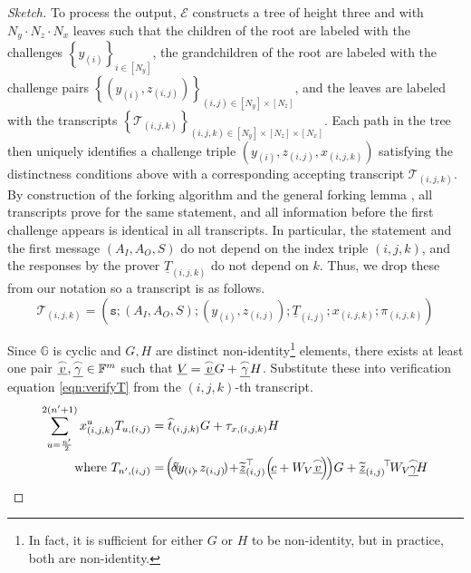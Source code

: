 \documentclass{article}
\theoremstyle{definition}
\newcommand{\GG}{\mathbb{G}}
\newcommand{\zq}{\widetilde{\underline{z}}}
\begin{document}
\begin{proof}[Sketch]
To process the output, $\mathcal{E}$ constructs a tree of height three and with $N_y \cdot N_z \cdot N_x$ leaves such that the children of the root are labeled with the challenges $\left\{y_{(i)}\right\}_{i \in [N_y]}$, the grandchildren of the root are labeled with the challenge pairs $\left\{(y_{(i)}, z_{(i,j)})\right\}_{(i,j) \in [N_y] \times [N_z]}$, and the leaves are labeled with the transcripts  $\left\{\mathcal{T}_{(i,j,k)}\right\}_{(i,j,k) \in [N_y] \times [N_z] \times [N_x]}$. Each path in the tree then uniquely identifies a challenge triple $(y_{(i)}, z_{(i,j)}, x_{(i,j,k)})$ satisfying the distinctness conditions above with a corresponding accepting transcript $\mathcal{T}_{(i,j,k)}$. By construction of the forking algorithm and the general forking lemma \cite{bellare2006multi}, all transcripts prove for the same statement, and all information before the first challenge appears is identical in all transcripts.  In particular, the statement and the first message $(A_I, A_O, S)$ do not depend on the index triple $(i,j,k)$, and the responses by the prover $\underline{T}_{(i,j,k)}$ do not depend on $k$. Thus, we drop these from our notation so a transcript is as follows.
$$\mathcal{T}_{(i,j,k)} = \left(\texttt{s}; (A_I, A_O, S); (y_{(i)}, z_{(i,j)}); \underline{T}_{(i,j)}; x_{(i,j,k)}; \pi_{(i,j,k)}\right)$$

Since $\GG$ is cyclic and $G, H$ are distinct non-identity\footnote{In fact, it is sufficient for either $G$ or $H$ to be non-identity, but in practice, both are non-identity.} elements, there exists at least one pair $\underline{\overset{\LARGE \frown}{\small{v}}}, \underline{\overset{\LARGE \frown}{\small{\gamma}}} \in \mathbb{F}^m$ such that $\underline{V} = \underline{\overset{\LARGE \frown}{\small{v}}}G + \underline{\overset{\LARGE \frown}{\small{\gamma}}}H$.  
Substitute these into verification equation \ref{eqn:verifyT} from the $(i,j,k)$-th transcript.
\begin{align*}
\sum_{u=\frac{n^\prime}{2}}^{2(n^\prime+1)} x^u_{(i,j,k)} T_{u, (i,j)} &= \widehat{t}_{(i,j,k)}G + \tau_{x,(i,j,k)}H \\
\text{ where }T_{n^\prime,(i,j)} &=\!\left(\!\delta\!(\!y_{(i)}\!,z_{(i,j)}\!)\!+\!\zq_{(i,j)}^\top\!\left(\!\underline{c} + W_V \underline{\overset{\LARGE \frown}{\small{v}}}\!\right)\!\right)\!G + \zq_{(i,j)}\!^\top\!W_V\!\underline{\overset{\LARGE \frown}{\small{\gamma}}}\!H 
\end{align*}


\end{proof}
\end{document}
